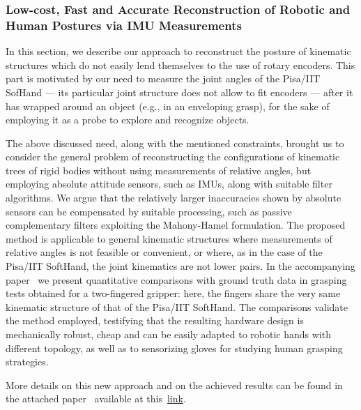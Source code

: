 
\subsubsection{Low-cost, Fast and Accurate Reconstruction of Robotic and Human Postures via IMU Measurements} 

In this section, we describe our approach to reconstruct the posture of kinematic structures which do not easily lend themselves to the use of rotary encoders. This part is motivated by our need to measure the joint angles of the Pisa/IIT SofHand --- its particular joint structure does not allow to fit encoders ---  after it has wrapped around an object (e.g., in an enveloping grasp), for the sake of employing it as a probe to explore and recognize objects.
 
The above discussed need, along with the mentioned constraints, brought us to consider the general problem of reconstructing the configurations of kinematic trees of rigid bodies without using measurements of relative angles, but employing absolute attitude sensors, such as IMUs, along with suitable filter algorithms. We argue that the relatively larger inaccuracies shown by absolute sensors can be compensated by suitable processing, such as passive complementary filters exploiting the Mahony-Hamel formulation. The proposed method is applicable to general kinematic structures where measurements of relative angles is not feasible or convenient, or where, as in the case of the Pisa/IIT SoftHand, the joint kinematics are not lower pairs. In the accompanying paper~\cite{Santaera:ICRA:2015} we present quantitative comparisons with ground truth data in grasping tests obtained for a two-fingered gripper: here, the fingers share the very same kinematic structure of that of the Pisa/IIT SoftHand. The comparisons validate the method employed, testifying that the resulting hardware design is mechanically robust, cheap and can be easily adapted to robotic hands with different topology, as well as to sensorizing gloves for studying human grasping strategies.

More details on this new approach and on the achieved results can be found in the attached paper~\cite{Santaera:ICRA:2015} available at this~\href{./attachedPapers/ReconstructionPosturesImuMeasurements.pdf}{link}.  